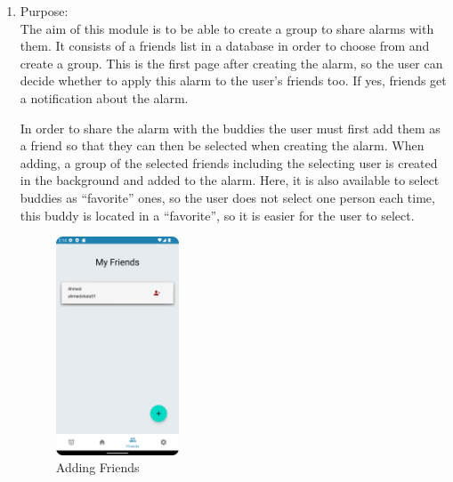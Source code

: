 \documentclass[conference]{IEEEtran}
\begin{document}
    
\begin{enumerate}
    \item Purpose: \\
        The aim of this module is to be able to create a group to share alarms with them. It consists of a friends list in a database in order to choose from and create a group. This is the first page after creating the alarm, so the user can decide whether to apply this alarm to the user’s friends too. If yes, friends get a notification about the alarm.
        \par In order to share the alarm with the buddies the user must first add them as a friend so that they can then be selected when creating the alarm. When adding, a group of the selected friends including the selecting user is created in the background and added to the alarm. Here, it is also available to select buddies as “favorite” ones, so the user does not select one person each time, this buddy is located in a “favorite”, so it is easier for the user to select.\\ 
        
    \begin{figure}[htbp]
        \centerline{\includegraphics[height=65mm,scale=0.5]{Images/App_MyFriends.png}}
        \caption{Adding Friends}
        \label{fig}
    \end{figure}
    

\end{enumerate}
\end{document}
